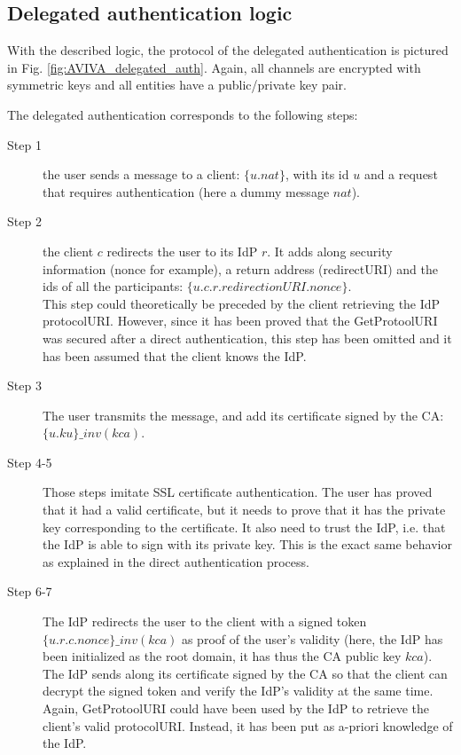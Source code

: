 \subsection{Delegated authentication logic}
With the described logic, the protocol of the delegated authentication is pictured in Fig. \ref{fig:AVIVA_delegated_auth}. Again, all channels are encrypted with symmetric keys and all entities have a public/private key pair.

The delegated authentication corresponds to the following steps:
\begin{description}
	\item[Step 1] the user sends a message to a client: $\{u.nat\}$, with its id $u$ and a  request that requires authentication (here a dummy message $nat$).
	\item[Step 2] the client $c$ redirects the user to its IdP $r$. It adds along security information (nonce for example), a return address (redirectURI) and the ids of all the participants: $\{u.c.r.redirectionURI.nonce\} $. 
	\\This step could theoretically be preceded by the client retrieving the IdP protocolURI. However, since it has been proved that the GetProtoolURI was secured after a direct authentication, this step has been omitted and it has been assumed that the client knows the IdP.
	\item[Step 3] The user transmits the message, and add its certificate signed by the CA: $ \{u.ku\}\_inv(kca) $.
	\item[Step 4-5] Those steps imitate SSL certificate authentication. The user has proved that it had a valid certificate, but it needs to prove that it has the private key corresponding to the certificate. It also need to trust the IdP, i.e. that the IdP is able to sign with its private key. This is the exact same behavior as explained in the direct authentication process.
	\item[Step 6-7] The IdP redirects the user to the client with a signed token $ \{u.r.c.nonce\}\_inv(kca) $ as proof of the user's validity (here, the IdP has been initialized as the root domain, it has thus the CA public key $ kca $). The IdP sends along its certificate signed by the CA so that the client can decrypt the signed token and verify the IdP's validity at the same time. \\
	Again, GetProtoolURI could have been used by the IdP to retrieve the client's valid protocolURI. Instead, it has been put as a-priori knowledge of the IdP.
\end{description}

